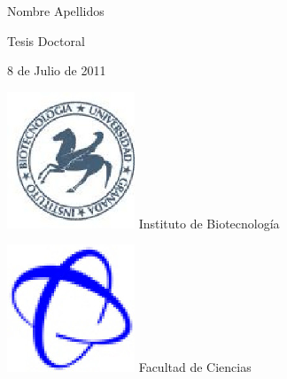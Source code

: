 \documentclass[b5paper,twoside,10pt]{book}
\begin{document}
\begin{center}
\large
Nombre Apellidos
\end{center}
\begin{center}
\large
Tesis Doctoral

8 de Julio de 2011
\end{center}
\cleardoublepage
\thispagestyle{empty}
\begin{minipage}[t]{.23\textwidth}
\centering
\includegraphics[width=.8\textwidth]{logo_ib}
Instituto de Biotecnolog\'ia 
\end{minipage}
\hfill
\begin{minipage}[t]{.23\textwidth}
\centering
\includegraphics[width=.7\textwidth]{logo_ciencias}
Facultad de Ciencias
\end{minipage}
\end{document}
